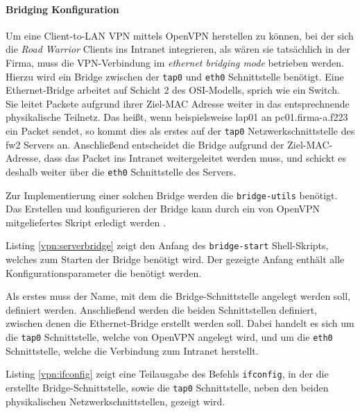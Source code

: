 \paragraph{Bridging Konfiguration}

Um eine Client-to-LAN VPN mittels OpenVPN herstellen zu können, bei der sich die \emph{Road Warrior} Clients ins Intranet integrieren, als wären sie tatsächlich in der Firma, muss die VPN-Verbindung im \emph{ethernet bridging mode} betrieben werden. Hierzu wird ein Bridge zwischen der \texttt{tap0} und \texttt{eth0} Schnittstelle benötigt. Eine Ethernet-Bridge arbeitet auf Schicht 2 des OSI-Modells, sprich wie ein Switch. Sie leitet Packete aufgrund ihrer Ziel-MAC Adresse weiter in das entsprechnende physikalische Teilnetz. Das heißt, wenn beispielsweise lap01 an pc01.firma-a.f223 ein Packet sendet, so kommt dies als erstes auf der \texttt{tap0} Netzwerkschnittstelle des fw2 Servers an. Anschließend entscheidet die Bridge aufgrund der Ziel-MAC-Adresse, dass das Packet ins Intranet weitergeleitet werden muss, und schickt es deshalb weiter über die \texttt{eth0} Schnittstelle des Servers.

Zur Implementierung einer solchen Bridge werden die \texttt{bridge-utils} benötigt. Das Erstellen und konfigurieren der Bridge kann durch ein von OpenVPN mitgeliefertes Skript erledigt werden \cite{OpenVPN}.



Listing \ref{vpn:serverbridge} zeigt den Anfang des \texttt{bridge-start} Shell-Skripts, welches zum Starten der Bridge benötigt wird. Der gezeigte Anfang enthält alle Konfigurationsparameter die benötigt werden.

Als erstes muss der Name, mit dem die Bridge-Schnittstelle angelegt werden soll, definiert werden. Anschließend werden die beiden Schnittstellen definiert, zwischen denen die Ethernet-Bridge erstellt werden soll. Dabei handelt es sich um die \texttt{tap0} Schnittstelle, welche von OpenVPN angelegt wird, und um die \texttt{eth0} Schnittstelle, welche die Verbindung zum Intranet herstellt.



Listing \ref{vpn:ifconfig} zeigt eine Teilausgabe des Befehls \texttt{ifconfig}, in der die erstellte Bridge-Schnittstelle, sowie die \texttt{tap0} Schnittstelle, neben den beiden physikalischen Netzwerkschnittstellen, gezeigt wird.

